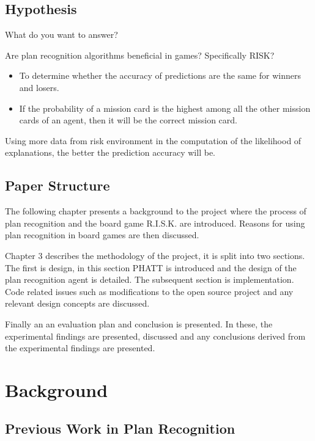 \documentclass[parskip]{cs4rep}
\begin{document}
\section{Hypothesis}

What do you want to answer?

Are plan recognition algorithms beneficial in games? Specifically RISK?

\begin{itemize}
\item
To determine whether the accuracy of predictions are the same for winners and losers.
\item
If the probability of a mission card is the highest among all the other mission cards of an agent, then it will be the correct mission card.
\newline
\end{itemize}

Using more data from risk environment in the computation of the likelihood of explanations, the better the prediction accuracy will be.

\section{Paper Structure}

The following chapter presents a background to the project where the process of plan recognition and the board game R.I.S.K. are introduced. Reasons for using plan recognition in board games are then discussed.

Chapter 3 describes the methodology of the project, it is split into two sections. The first is design, in this section PHATT is introduced and the design of the plan recognition agent is detailed. The subsequent section is implementation. Code related issues such as modifications to the open source project and any relevant design concepts are discussed. 

Finally an an evaluation plan and conclusion is presented. In these, the experimental findings are presented, discussed and any conclusions derived from the experimental findings are presented.

\chapter{Background}

\section{Previous Work in Plan Recognition}
\end{document}
